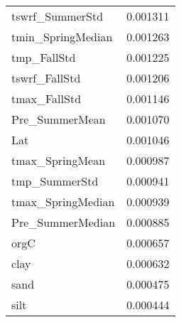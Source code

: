 \begin{tabular}{lr}
tswrf_SummerStd & 0.001311 \\
tmin_SpringMedian & 0.001263 \\
tmp_FallStd & 0.001225 \\
tswrf_FallStd & 0.001206 \\
tmax_FallStd & 0.001146 \\
Pre_SummerMean & 0.001070 \\
Lat & 0.001046 \\
tmax_SpringMean & 0.000987 \\
tmp_SummerStd & 0.000941 \\
tmax_SpringMedian & 0.000939 \\
Pre_SummerMedian & 0.000885 \\
orgC & 0.000657 \\
clay & 0.000632 \\
sand & 0.000475 \\
silt & 0.000444 \\
\bottomrule
\end{tabular}
